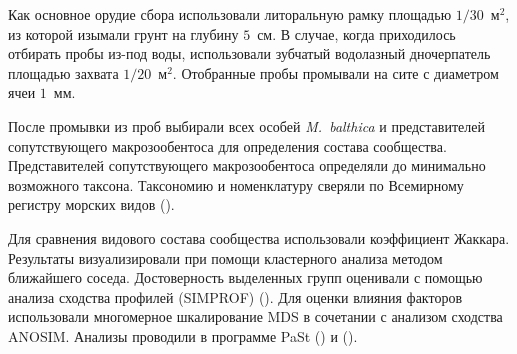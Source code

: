 Как основное орудие сбора использовали литоральную рамку площадью $1/30$~м$^2$, из которой изымали грунт на глубину $5$~см. 
В случае, когда приходилось отбирать пробы из-под воды, использовали зубчатый водолазный дночерпатель площадью захвата $1/20$~м$^2$.
Отобранные пробы промывали на сите с диаметром ячеи $1$~мм. 

После промывки из   проб   выбирали   всех   особей  {\it M.~balthica}  и   представителей   сопутствующего макрозообентоса    для   определения   состава   сообщества.
Представителей   сопутствующего макрозообентоса  определяли   до   минимально   возможного   таксона. Таксономию и номенклатуру сверяли по Всемирному регистру морских видов (\cite{WoRMS}).

Для сравнения видового состава сообщества использовали коэффициент Жаккара. 
Результаты визуализировали при помощи  кластерного анализа методом ближайшего соседа. 
Достоверность выделенных групп оценивали с помощью анализа сходства профилей (SIMPROF) (\cite{Clarke_et_al_2008}).
Для оценки влияния факторов использовали многомерное шкалирование MDS в сочетании с анализом сходства ANOSIM.
Анализы проводили в программе PaSt (\cite{Hammer_et_al_2001}) и \R{} (\cite{R_2014}).







